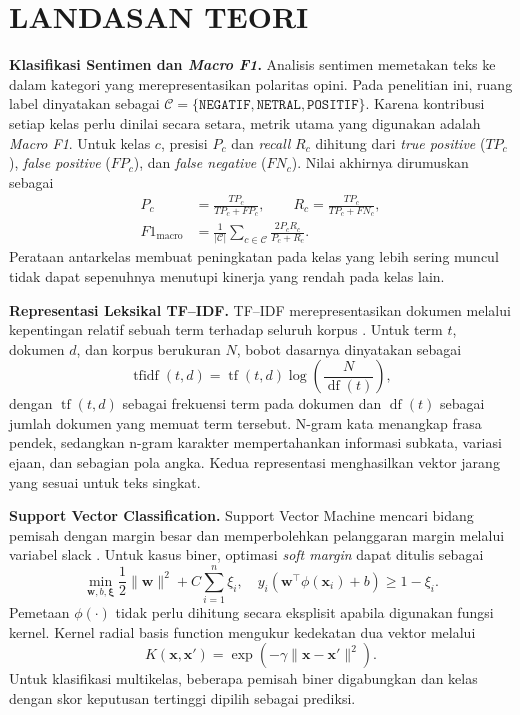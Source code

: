 \section{LANDASAN TEORI}

\textbf{Klasifikasi Sentimen dan \textit{Macro F1}.} Analisis sentimen memetakan teks ke dalam kategori yang merepresentasikan polaritas opini. Pada penelitian ini, ruang label dinyatakan sebagai $\mathcal{C}=\{\texttt{NEGATIF},\texttt{NETRAL},\texttt{POSITIF}\}$. Karena kontribusi setiap kelas perlu dinilai secara setara, metrik utama yang digunakan adalah \textit{Macro F1}. Untuk kelas $c$, presisi $P_c$ dan \textit{recall} $R_c$ dihitung dari \textit{true positive} ($TP_c$), \textit{false positive} ($FP_c$), dan \textit{false negative} ($FN_c$). Nilai akhirnya dirumuskan sebagai
\begin{equation}
\begin{aligned}
P_c&=\frac{TP_c}{TP_c+FP_c},\qquad
R_c=\frac{TP_c}{TP_c+FN_c},\\
F1_{\mathrm{macro}}&=\frac{1}{|\mathcal{C}|}
\sum_{c\in\mathcal{C}}\frac{2P_cR_c}{P_c+R_c}.
\end{aligned}
\end{equation}
Perataan antarkelas membuat peningkatan pada kelas yang lebih sering muncul tidak dapat sepenuhnya menutupi kinerja yang rendah pada kelas lain.

\textbf{Representasi Leksikal TF--IDF.} TF--IDF merepresentasikan dokumen melalui kepentingan relatif sebuah term terhadap seluruh korpus \cite{salton88}. Untuk term $t$, dokumen $d$, dan korpus berukuran $N$, bobot dasarnya dinyatakan sebagai
\begin{equation}
\operatorname{tfidf}(t,d)=\operatorname{tf}(t,d)
\log\!\left(\frac{N}{\operatorname{df}(t)}\right),
\end{equation}
dengan $\operatorname{tf}(t,d)$ sebagai frekuensi term pada dokumen dan $\operatorname{df}(t)$ sebagai jumlah dokumen yang memuat term tersebut. N-gram kata menangkap frasa pendek, sedangkan n-gram karakter mempertahankan informasi subkata, variasi ejaan, dan sebagian pola angka. Kedua representasi menghasilkan vektor jarang yang sesuai untuk teks singkat.

\textbf{Support Vector Classification.} Support Vector Machine mencari bidang pemisah dengan margin besar dan memperbolehkan pelanggaran margin melalui variabel slack \cite{cortes95}. Untuk kasus biner, optimasi \textit{soft margin} dapat ditulis sebagai
\begin{equation}
\min_{\mathbf{w},b,\boldsymbol{\xi}}
\frac{1}{2}\lVert\mathbf{w}\rVert^2+C\sum_{i=1}^{n}\xi_i,
\quad
y_i(\mathbf{w}^{\top}\phi(\mathbf{x}_i)+b)\geq 1-\xi_i.
\end{equation}
Pemetaan $\phi(\cdot)$ tidak perlu dihitung secara eksplisit apabila digunakan fungsi kernel. Kernel radial basis function mengukur kedekatan dua vektor melalui
\begin{equation}
K(\mathbf{x},\mathbf{x}')=
\exp\!\left(-\gamma\lVert\mathbf{x}-\mathbf{x}'\rVert^2\right).
\end{equation}
Untuk klasifikasi multikelas, beberapa pemisah biner digabungkan dan kelas dengan skor keputusan tertinggi dipilih sebagai prediksi.

